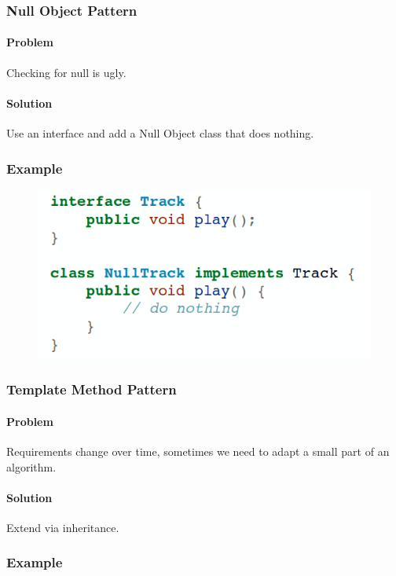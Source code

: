 \documentclass[twocolumn,english]{article}
\begin{document}
\subsubsection{Null Object Pattern}

\paragraph{Problem}

Checking for null is ugly.

\paragraph{Solution}

Use an interface and add a Null Object class that does nothing.

\subsubsection*{Example}

\begin{figure}[H]
\centering{}\includegraphics[width=0.4\columnwidth]{img/null-object}
\end{figure}

\subsubsection{Template Method Pattern}

\paragraph{Problem}

Requirements change over time, sometimes we need to adapt a small
part of an algorithm.

\paragraph{Solution}

Extend via inheritance.

\subsubsection*{Example}
\end{document}
